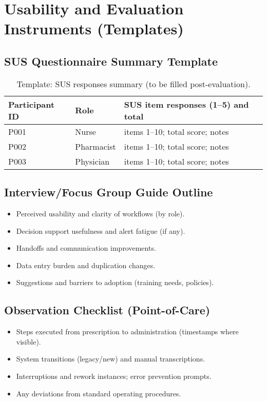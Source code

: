 \section{Usability and Evaluation Instruments (Templates)}
\subsection{SUS Questionnaire Summary Template}
\begin{table}[H]
    \centering
    \caption{Template: SUS responses summary (to be filled post-evaluation).}
    \label{tab:template_sus}
    {\setlength{\tabcolsep}{4pt}\small
    \begin{tabularx}{\textwidth}{@{}p{3cm} p{3cm} >{\raggedright\arraybackslash}X@{}}
        \toprule
        \textbf{Participant ID} & \textbf{Role} & \textbf{SUS item responses (1--5) and total} \\
        \midrule
        P001 & Nurse & items 1--10; total score; notes \\
        P002 & Pharmacist & items 1--10; total score; notes \\
        P003 & Physician & items 1--10; total score; notes \\
        \bottomrule
    \end{tabularx}}
\end{table}

\subsection{Interview/Focus Group Guide Outline}
\begin{itemize}
    \item Perceived usability and clarity of workflows (by role).
    \item Decision support usefulness and alert fatigue (if any).
    \item Handoffs and communication improvements.
    \item Data entry burden and duplication changes.
    \item Suggestions and barriers to adoption (training needs, policies).
\end{itemize}

\subsection{Observation Checklist (Point-of-Care)}
\begin{itemize}
    \item Steps executed from prescription to administration (timestamps where visible).
    \item System transitions (legacy/new) and manual transcriptions.
    \item Interruptions and rework instances; error prevention prompts.
    \item Any deviations from standard operating procedures.
\end{itemize}

